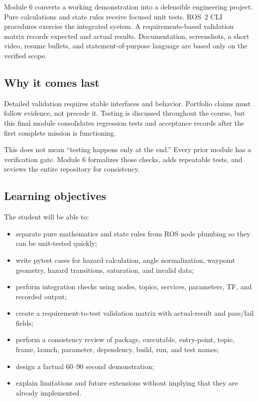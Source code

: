 \documentclass[11pt]{article}
\begin{document}
Module 6 converts a working demonstration into a defensible engineering
project. Pure calculations and state rules receive focused unit tests. ROS~2
CLI procedures exercise the integrated system. A requirements-based validation
matrix records expected and actual results. Documentation, screenshots, a short
video, resume bullets, and statement-of-purpose language are based only on the
verified scope.

\subsection{Why it comes last}

Detailed validation requires stable interfaces and behavior. Portfolio claims
must follow evidence, not precede it. Testing is discussed throughout the
course, but this final module consolidates regression tests and acceptance
records after the first complete mission is functioning.

This does not mean ``testing happens only at the end.'' Every prior module has
a verification gate. Module 6 formalizes those checks, adds repeatable tests,
and reviews the entire repository for consistency.

\subsection{Learning objectives}

The student will be able to:

\begin{itemize}
  \item separate pure mathematics and state rules from ROS node plumbing so
        they can be unit-tested quickly;
  \item write pytest cases for hazard calculation, angle normalization,
        waypoint geometry, hazard transitions, saturation, and invalid data;
  \item perform integration checks using nodes, topics, services, parameters,
        TF, and recorded output;
  \item create a requirement-to-test validation matrix with actual-result and
        pass/fail fields;
  \item perform a consistency review of package, executable, entry-point,
        topic, frame, launch, parameter, dependency, build, run, and test names;
  \item design a factual 60--90 second demonstration;
  \item explain limitations and future extensions without implying that they
        are already implemented.
\end{itemize}
\end{document}

